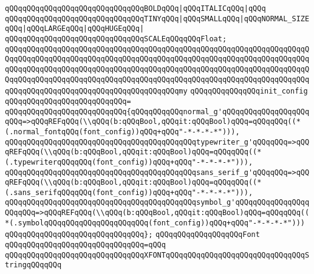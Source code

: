\verb|qQQqqQQqqQQqqQQqqQQqqQQqqQQqqQQqBOLDqQQq|\verb#|qQQqITALICqQQq|qQQq#\newline
\verb|qQQqqQQqqQQqqQQqqQQqqQQqqQQqqQQqTINYqQQq|\verb#|qQQqSMALLqQQq|qQQqNORMAL_SIZEqQQq|qQQqLARGEqQQq|qQQqHUGEqQQq|#\newline
\verb|qQQqqQQqqQQqqQQqqQQqqQQqqQQqqQQqSCALEqQQqqQQqFloat;|\newline
\newline
\verb|qQQqqQQqqQQqqQQqqQQqqQQqqQQqqQQqqQQqqQQqqQQqqQQqqQQqqQQqqQQqqQQqqQQqqQQqqQQqqQQqqQQqqQQqqQQqqQQqqQQqqQQqqQQqqQQqqQQqqQQqqQQqqQQqqQQqqQQqqQQqqQQqqQQqqQQqqQQqqQQqqQQqqQQqqQQqqQQqqQQqqQQqqQQqqQQqqQQqqQQqqQQqqQQqqQQqqQQqqQQqqQQqqQQqqQQqqQQqqQQqqQQqqQQqqQQqqQQqqQQqqQQqqQQqqQQqqQQqqQQqqQQqqQQqqQQqqQQqqQQqqQQqqQQqqQQqqQQqqQQqmy|\newline
\verb|qQQqqQQqqQQqqQQqinit_config|\newline
\verb|qQQqqQQqqQQqqQQqqQQqqQQqqQQq=|\newline
\verb|qQQqqQQqqQQqqQQqqQQqqQQqqQQq{qQQqqQQqqQQqnormal_g'qQQqqQQqqQQqqQQqqQQqqQQq=>qQQqREFqQQq(\\qQQq(b:qQQqBool,qQQqit:qQQqBool)qQQq=qQQqqQQq((*(.normal_fontqQQq(font_config))qQQq+qQQq"-*-*-*-*"))),|\newline
\verb|qQQqqQQqqQQqqQQqqQQqqQQqqQQqqQQqqQQqqQQqqQQqtypewriter_g'qQQqqQQq=>qQQqREFqQQq(\\qQQq(b:qQQqBool,qQQqit:qQQqBool)qQQq=qQQqqQQq((*(.typewriterqQQqqQQq(font_config))qQQq+qQQq"-*-*-*-*"))),|\newline
\verb|qQQqqQQqqQQqqQQqqQQqqQQqqQQqqQQqqQQqqQQqqQQqsans_serif_g'qQQqqQQq=>qQQqREFqQQq(\\qQQq(b:qQQqBool,qQQqit:qQQqBool)qQQq=qQQqqQQq((*(.sans_serifqQQqqQQq(font_config))qQQq+qQQq"-*-*-*-*"))),|\newline
\verb|qQQqqQQqqQQqqQQqqQQqqQQqqQQqqQQqqQQqqQQqqQQqsymbol_g'qQQqqQQqqQQqqQQqqQQqqQQq=>qQQqREFqQQq(\\qQQq(b:qQQqBool,qQQqit:qQQqBool)qQQq=qQQqqQQq((*(.symbolqQQqqQQqqQQqqQQqqQQqqQQq(font_config))qQQq+qQQq"-*-*-*-*")))|\newline
\verb|qQQqqQQqqQQqqQQqqQQqqQQqqQQqqQQq};|\newline
\newline
\newline
\verb|qQQqqQQqqQQqqQQqqQQqFont|\newline
\verb|qQQqqQQqqQQqqQQqqQQqqQQqqQQqqQQq=qQQq|\newline
\verb|qQQqqQQqqQQqqQQqqQQqqQQqqQQqqQQqXFONTqQQqqQQqqQQqqQQqqQQqqQQqqQQqqQQqStringqQQqqQQq|\newline
